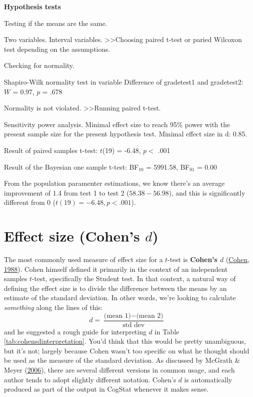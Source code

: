 \documentclass[
]{book}
\theoremstyle{definition}
\theoremstyle{definition}
\theoremstyle{definition}
\theoremstyle{definition}
\theoremstyle{remark}
\begin{document}
\begin{tcolorbox}[colback=white,
  colframe=lightgray,
  coltext=black,
  boxsep=4pt,
  boxrule=0.3pt,
  arc=0pt]
  {   \sffamily
      \color{CSblue}\textbf{Hypothesis tests}
      
      \color{CSgreen}Testing if the means are the same.
      
      Two variables. Interval variables.  \textgreater\textgreater  Choosing paired t-test or paried Wilcoxon test depending on the assumptions.

      Checking for normality.

      \color{black}
      Shapiro-Wilk normality test in variable Difference of grade\textunderscore test1 and grade\textunderscore test2: $W$ = 0.97, $p$ = .678

      \color{CSgreen}
      Normality is not violated. \textgreater\textgreater Running paired t-test.

      \color{black}
      Sensitivity power analysis. Minimal effect size to reach 95\% power with the present sample size for the present hypothesis test. Minimal effect size in d: 0.85.
      
      Result of paired samples t-test: $t$(19) = -6.48, $p <$ .001

      Result of the Bayesian one sample t-test: BF$_{10}$ = 5991.58, BF$_{01}$ = 0.00
      \normalfont
  }
\end{tcolorbox}

From the population paramenter estimations, we know there's an average improvement of 1.4 from test 1 to test 2 (\(58.38 - 56.98\)), and this is significantly different from 0 (\(t(19)=-6.48, p<.001\)).

\hypertarget{cohensd}{%
\section{\texorpdfstring{Effect size (Cohen's \(d\))}{Effect size (Cohen's d)}}\label{cohensd}}

The most commonly used measure of effect size for a \(t\)-test is \textbf{Cohen's \(d\)} (\protect\hyperlink{ref-Cohen1988}{Cohen, 1988}). Cohen himself defined it primarily in the context of an independent samples \(t\)-test, specifically the Student test. In that context, a natural way of defining the effect size is to divide the difference between the means by an estimate of the standard deviation. In other words, we're looking to calculate \emph{something} along the lines of this:
\[
d = \frac{\mbox{(mean 1)} - \mbox{(mean 2)}}{\mbox{std dev}}
\]
and he suggested a rough guide for interpreting \(d\) in Table \ref{tab:cohensdinterpretation}. You'd think that this would be pretty unambiguous, but it's not; largely because Cohen wasn't too specific on what he thought should be used as the measure of the standard deviation. As discussed by McGrath \& Meyer (\protect\hyperlink{ref-McGrath2006}{2006}), there are several different versions in common usage, and each author tends to adopt slightly different notation. Cohen's \(d\) is automatically produced as part of the output in CogStat whenever it makes sense.
\end{document}
